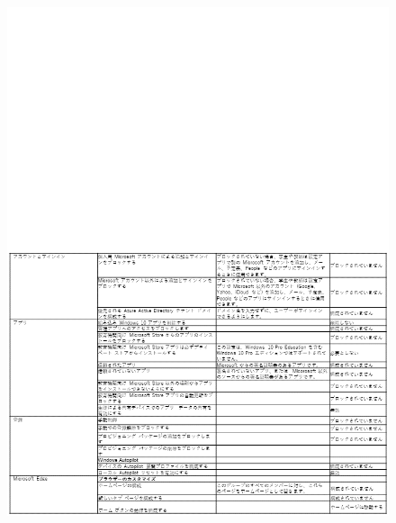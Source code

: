 \begin{figure}[htbp]
    \centering
    \vspace{-11cm}
    \includegraphics[width=17cm]{figures/IntuneforEducation-01.png}
\end{figure}

